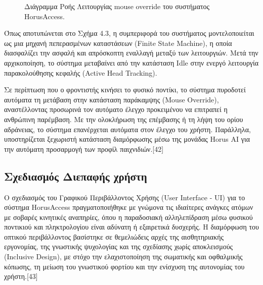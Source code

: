 \documentclass[twoside, a4paper, 11pt]{article}
\begin{document}
\begin{figure}[H]
{%
    }
    \caption{Διάγραμμα Ροής Λειτουργίας mouse override του συστήματος HorusAccess.}
    \label{fig:flowchart}
\end{figure}


Όπως αποτυπώνεται στο Σχήμα 4.3, η συμπεριφορά του συστήματος μοντελοποιείται ως μια μηχανή πεπερασμένων καταστάσεων (Finite State Machine), η οποία διασφαλίζει την ασφαλή και απρόσκοπτη εναλλαγή μεταξύ των λειτουργιών. Μετά την αρχικοποίηση, το σύστημα μεταβαίνει από την κατάσταση Idle στην ενεργό λειτουργία παρακολούθησης κεφαλής (Active Head Tracking).

Σε περίπτωση που ο φροντιστής κινήσει το φυσικό ποντίκι, το σύστημα πυροδοτεί αυτόματα τη μετάβαση στην κατάσταση παράκαμψης (Mouse Override), αναστέλλοντας προσωρινά τον αυτόματο έλεγχο προκειμένου να επιτραπεί η ανθρώπινη παρέμβαση. Με την ολοκλήρωση της επέμβασης ή τη λήψη του ορίου αδράνειας, το σύστημα επανέρχεται αυτόματα στον έλεγχο του χρήστη. Παράλληλα, υποστηρίζεται ξεχωριστή κατάσταση διαμόρφωσης μέσω της μονάδας Horus AI για την αυτόματη προσαρμογή των προφίλ παιχνιδιών.[42]

\subsection{Σχεδιασμός Διεπαφής χρήστη}
Ο σχεδιασμός του Γραφικού Περιβάλλοντος Χρήσης (User Interface - UI) για το σύστημα HorusAccess πραγματοποιήθηκε με γνώμονα τις 
ιδιαίτερες ανάγκες ατόμων με σοβαρές κινητικές αναπηρίες, όπου η παραδοσιακή αλληλεπίδραση μέσω φυσικού ποντικιού και πληκτρολογίου 
είναι αδύνατη ή εξαιρετικά δυσχερής. Η διαμόρφωση του οπτικού περιβάλλοντος βασίστηκε σε θεμελιώδεις αρχές της αισθητηριακής εργονομίας, 
της γνωστικής ψυχολογίας και της σχεδίασης χωρίς αποκλεισμούς (Inclusive Design), με στόχο την ελαχιστοποίηση της σωματικής και οφθαλμικής κόπωσης, 
τη μείωση του γνωστικού φορτίου και την ενίσχυση της αυτονομίας του χρήστη.[43]
\end{document}
